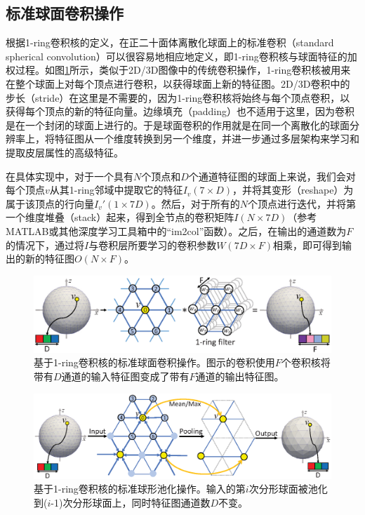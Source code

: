 \subsection{标准球面卷积操作}
根据1-ring卷积核的定义，在正二十面体离散化球面上的标准卷积（standard spherical convolution）可以很容易地相应地定义，即1-ring卷积核与球面特征的加权过程。如图\ref{fig:fig_std_conv}所示，类似于2D/3D图像中的传统卷积操作，1-ring卷积核被用来在整个球面上对每个顶点进行卷积，以获得球面上新的特征图。2D/3D卷积中的步长（stride）在这里是不需要的，因为1-ring卷积核将始终与每个顶点卷积，以获得每个顶点的新的特征向量。边缘填充（padding）也不适用于这里，因为卷积是在一个封闭的球面上进行的。于是球面卷积的作用就是在同一个离散化的球面分辨率上，将特征图从一个维度转换到另一个维度，并进一步通过多层架构来学习和提取皮层属性的高级特征。

在具体实现中，对于一个具有$N$个顶点和$D$个通道特征图的球面上来说，我们会对每个顶点$v$从其1-ring邻域中提取它的特征$I_v(7\times D)$，并将其变形（reshape）为属于该顶点的行向量$I_v'(1\times 7D)$。然后，对于所有的$N$个顶点进行迭代，并将第一个维度堆叠（stack）起来，得到全节点的卷积矩阵$I(N\times 7D)$（参考MATLAB或其他深度学习工具箱中的“im2col”函数）。之后，在输出的通道数为$F$的情况下，通过将$I$与卷积层所要学习的卷积参数$W(7D\times F)$相乘，即可得到输出的新的特征图$O(N\times F)$。

\begin{figure}[t]
	\centering
	\includegraphics[width=\linewidth]{figure/figure_convolution.eps}
	\caption{基于1-ring卷积核的标准球面卷积操作。图示的卷积使用$F$个卷积核将带有$D$通道的输入特征图变成了带有$F$通道的输出特征图。}
	\label{fig:fig_std_conv}
\end{figure}

\begin{figure}[t]
	\centering
	\includegraphics[width=\linewidth]{figure/figure_pooling_layer.eps}
	\caption{基于1-ring卷积核的标准球形池化操作。输入的第$i$次分形球面被池化到($i$-1)次分形球面上，同时特征图通道数$D$不变。}
	\label{fig:fig_std_pooling}
\end{figure}

